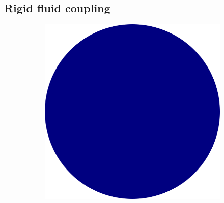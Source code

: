\documentclass[preprint,12pt]{elsarticle}
\begin{document}


\FloatBarrier%
\subsection{Rigid fluid coupling}
\label{sec:rfc}

\begin{figure}[!htpb]
  \centering
  \begin{subfigure}{0.22\textwidth}
    \centering
    \includegraphics[width=1.0\textwidth]{images/rfc_explantion_schematic/real_spherical_particles}
    \subcaption{}%
  \end{subfigure}\hspace{15mm}%
  \begin{subfigure}{0.24\textwidth}
    \centering

\end{subfigure}
\end{figure}
\end{document}
